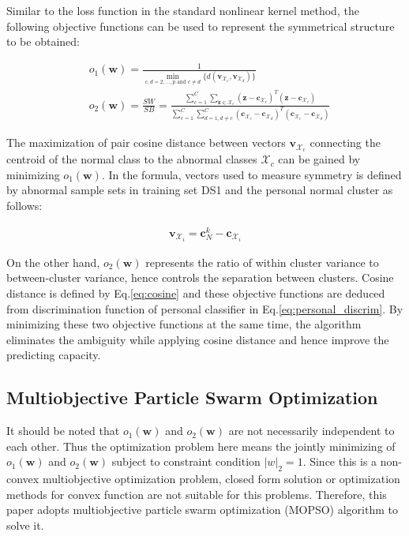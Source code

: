 Similar to the loss function in the standard nonlinear kernel method, the following objective functions can be used to represent the symmetrical structure to be obtained:

\begin{align}
\label{eq:obj}
&o_1(\mathbf{w}) = \frac{1}{\underset{c,d=2,\dots,p \text{ and } c\neq d }{\min}\{d(\mathbf{v}_{\mathcal{X}_c},\mathbf{v}_{\mathcal{X}_d})\}} \\ %
\nonumber 
&o_2(\mathbf{w}) = \frac{SW}{SB}=\frac{\sum_{c=1}^{C}  \sum_{\mathbf{z} \in \mathcal{X}_c}   (\mathbf{z}-\mathbf{c}_{\mathcal{X}_c})^T(\mathbf{z}-\mathbf{c}_{\mathcal{X}_c})}{\sum_{c=1}^{C}\sum_{d=1, d\neq c}^{C}  (\mathbf{c}_{\mathcal{X}_c}-\mathbf{c}_{\mathcal{X}_d})^T(\mathbf{c}_{\mathcal{X}_c}-\mathbf{c}_{\mathcal{X}_d}) }
\end{align}

The maximization of pair cosine distance between vectors $\mathbf{v}_{\mathcal{X}_c}$ connecting the centroid of the normal class to the abnormal classes $\mathcal{X}_c$ can be gained by minimizing $o_1(\mathbf{w})$. In the formula, vectors used to measure symmetry is defined by abnormal sample sets in training set DS1 and the personal normal cluster as follows:

\begin{align}
\mathbf{v}_{\mathcal{X}_i} = \mathbf{c}^k_N -  \mathbf{c}_{\mathcal{X}_i}
\end{align}

On the other hand, $o_2(\mathbf{w})$ represents the ratio of within cluster variance to between-cluster variance, hence controls the separation between clusters. Cosine distance is defined by Eq.\ref{eq:cosine} and these objective functions are deduced from discrimination function of personal classifier in Eq.\ref{eq:personal_discrim}. By minimizing these two objective functions at the same time, the algorithm eliminates the ambiguity while applying cosine distance and hence improve the predicting capacity.

\subsection{Multiobjective Particle Swarm Optimization}

It should be noted that $o_1(\mathbf{w}) $ and $o_2(\mathbf{w})$ are not necessarily independent to each other. Thus the optimization problem here means the jointly minimizing of $o_1(\mathbf{w}) $ and $o_2(\mathbf{w})$ subject to constraint condition $|w|_2=1$. Since this is a non-convex multiobjective optimization problem, closed form solution or optimization methods for convex function are not suitable for this problems. Therefore, this paper adopts multiobjective particle swarm optimization (MOPSO) algorithm to solve it.

